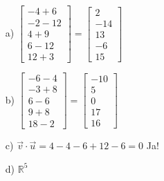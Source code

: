 \begin{itemize}
\item[a) ] $\begin{bmatrix}-4+6\\-2-12\\4+9\\6-12\\12+3\end{bmatrix}=\begin{bmatrix}2\\-14\\13\\-6\\15\end{bmatrix}$
\item[b) ] $\begin{bmatrix}-6-4\\-3+8\\6-6\\9+8\\18-2\end{bmatrix}=\begin{bmatrix}-10\\5\\0\\17\\16\end{bmatrix} $
\item[c) ] $\vec{v}\cdot\vec{u}=4-4-6+12-6=0$ Ja!
\item[d) ] $\mathbb{R}^5$
\end{itemize}